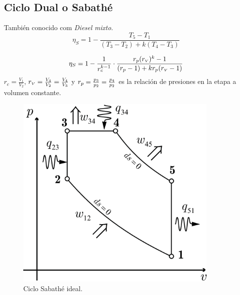 \documentclass{article}
\newcommand{\ctegas}{k}
\newcommand{\rc}{r_c}
\newcommand{\rp}{r_{\mbox{\scriptsize$p$}}}
\newcommand{\rv}{r_{\mbox{\tiny$V$}}}
\begin{document}
\subsection{Ciclo Dual o Sabathé}
También conocido com \textit{Diesel mixto}. 
\begin{equation}
\eta_S=1- \frac{T_5-T_1}{(T_3-T_2)+\ctegas(T_4-T_3)}
\end{equation}

\begin{equation}
\eta_S=1-\frac{1}{\rc^{\ctegas -1}}\cdot \frac{\rp(\rv)^\ctegas-1}{(\rp -1)+\ctegas\rp(\rv-1)}
\end{equation}
$\rc=\frac{V_1}{V_2}$, $\rv=\frac{V_4}{V_2}=\frac{V_4}{V_3}$ y $\rp=\frac{p_3}{p_2}=\frac{p_4}{p_2}$ es la relación de presiones en la etapa a volumen constante.
\begin{figure}[htb!]
    \centering
    \includegraphics[width=10cm]{fig/ciclodual.eps}
    \caption{Ciclo Sabathé ideal.}
    \label{fig:dualideal}
\end{figure}
\end{document}
